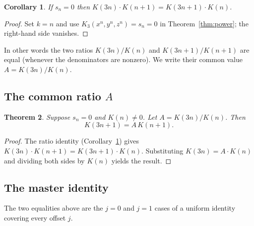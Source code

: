 \documentclass[12pt]{article}
\newtheorem{theorem}{Theorem}[section]
\newtheorem{corollary}[theorem]{Corollary}
\theoremstyle{definition}
\begin{document}
	\begin{corollary}
		\label{cor:sn-ratio}
		If $s_n = 0$ then $K(3n) \cdot K(n+1) = K(3n+1) \cdot K(n)$.
	\end{corollary}
	\begin{proof}
		Set $k = n$ and use $K_3(x^n,y^n,z^n) = s_n = 0$ in Theorem~\ref{thm:power}; the right-hand side vanishes.
	\end{proof}
	
	In other words the two ratios $K(3n)/K(n)$ and $K(3n+1)/K(n+1)$ are
	equal (whenever the denominators are nonzero).  We write their common
	value $A = K(3n)/K(n)$.
	
	\subsection{The common ratio $A$}
	
	\begin{theorem}
		\label{thm:sn-ratio}
		Suppose $s_n = 0$ and $K(n) \neq 0$.  Let $A = K(3n)/K(n)$.  Then
		\[
		K(3n+1) = A\,K(n+1).
		\]
	\end{theorem}
	\begin{proof}
		The ratio identity (Corollary~\ref{cor:sn-ratio}) gives
		$K(3n) \cdot K(n+1) = K(3n+1) \cdot K(n)$.  Substituting $K(3n) = A \cdot K(n)$
		and dividing both sides by $K(n)$ yields the result.
	\end{proof}
	
	\subsection{The master identity}
	
	The two equalities above are the $j = 0$ and $j = 1$ cases of a
	uniform identity covering every offset $j$.
	
\end{document}
